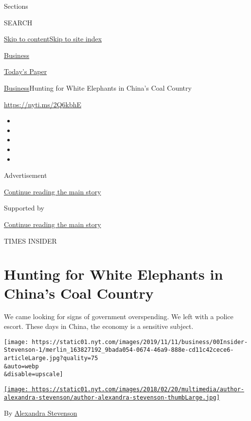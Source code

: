 Sections

SEARCH

\protect\hyperlink{site-content}{Skip to
content}\protect\hyperlink{site-index}{Skip to site index}

\href{https://www.nytimes.com/section/business}{Business}

\href{https://myaccount.nytimes.com/auth/login?response_type=cookie\&client_id=vi}{}

\href{https://www.nytimes.com/section/todayspaper}{Today's Paper}

\href{/section/business}{Business}\textbar{}Hunting for White Elephants
in China's Coal Country

\url{https://nyti.ms/2Q6kbhE}

\begin{itemize}
\item
\item
\item
\item
\item
\end{itemize}

Advertisement

\protect\hyperlink{after-top}{Continue reading the main story}

Supported by

\protect\hyperlink{after-sponsor}{Continue reading the main story}

TIMES INSIDER

\hypertarget{hunting-for-white-elephants-in-chinas-coal-country}{%
\section{Hunting for White Elephants in China's Coal
Country}\label{hunting-for-white-elephants-in-chinas-coal-country}}

We came looking for signs of government overspending. We left with a
police escort. These days in China, the economy is a sensitive subject.

\texttt{[image: https://static01.nyt.com/images/2019/11/11/business/00Insider-Stevenson-1/merlin\_163827192\_9bada054-0674-46a9-888e-cd11c42cece6-articleLarge.jpg?quality=75\\\&auto=webp\\\&disable=upscale]}

\href{https://www.nytimes.com/by/alexandra-stevenson}{\texttt{[image: https://static01.nyt.com/images/2018/02/20/multimedia/author-alexandra-stevenson/author-alexandra-stevenson-thumbLarge.jpg]}}

By \href{https://www.nytimes.com/by/alexandra-stevenson}{Alexandra
Stevenson}

